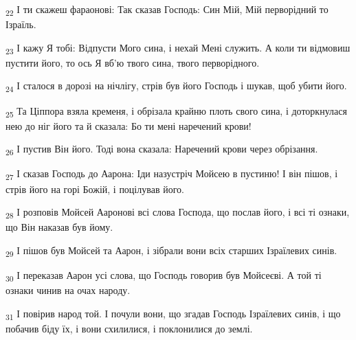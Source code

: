 \begin{tcolorbox}
\textsubscript{22} І ти скажеш фараонові: Так сказав Господь: Син Мій, Мій перворідний то Ізраїль.
\end{tcolorbox}
\begin{tcolorbox}
\textsubscript{23} І кажу Я тобі: Відпусти Мого сина, і нехай Мені служить. А коли ти відмовиш пустити його, то ось Я вб'ю твого сина, твого перворідного.
\end{tcolorbox}
\begin{tcolorbox}
\textsubscript{24} І сталося в дорозі на нічлігу, стрів був його Господь і шукав, щоб убити його.
\end{tcolorbox}
\begin{tcolorbox}
\textsubscript{25} Та Ціппора взяла кременя, і обрізала крайню плоть свого сина, і доторкнулася нею до ніг його та й сказала: Бо ти мені наречений крови!
\end{tcolorbox}
\begin{tcolorbox}
\textsubscript{26} І пустив Він його. Тоді вона сказала: Наречений крови через обрізання.
\end{tcolorbox}
\begin{tcolorbox}
\textsubscript{27} І сказав Господь до Аарона: Іди назустріч Мойсею в пустиню! І він пішов, і стрів його на горі Божій, і поцілував його.
\end{tcolorbox}
\begin{tcolorbox}
\textsubscript{28} І розповів Мойсей Ааронові всі слова Господа, що послав його, і всі ті ознаки, що Він наказав був йому.
\end{tcolorbox}
\begin{tcolorbox}
\textsubscript{29} І пішов був Мойсей та Аарон, і зібрали вони всіх старших Ізраїлевих синів.
\end{tcolorbox}
\begin{tcolorbox}
\textsubscript{30} І переказав Аарон усі слова, що Господь говорив був Мойсеєві. А той ті ознаки чинив на очах народу.
\end{tcolorbox}
\begin{tcolorbox}
\textsubscript{31} І повірив народ той. І почули вони, що згадав Господь Ізраїлевих синів, і що побачив біду їх, і вони схилилися, і поклонилися до землі.
\end{tcolorbox}

